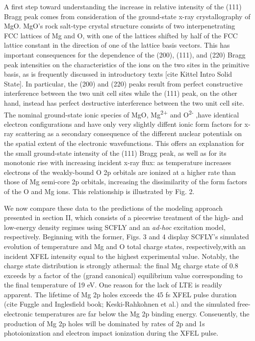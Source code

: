 A first step toward understanding the increase in relative intensity of
the (111) Bragg peak comes from consideration of the ground-state x-ray
crystallography of MgO. MgO's rock salt-type crystal structure consists
of two interpenetrating FCC lattices of Mg and O, with one of the
lattices shifted by half of the FCC lattice constant in the direction of
one of the lattice basis vectors. This has important consequences for
the dependence of the (200), (111), and (220) Bragg peak intensities on
the characteristics of the ions on the two sites in the primitive basis,
as is frequently discussed in introductory texts {[}cite Kittel Intro
Solid State{]}. In particular, the (200) and (220) peaks result from
perfect constructive interference between the two unit cell sites while
the (111) peak, on the other hand, instead has perfect destructive
interference between the two unit cell site. The nominal ground-state
ionic species of MgO, Mg\textsuperscript{2+} and O\textsuperscript{2-}
,have identical electron configurations and have only very slightly
diffent ionic form factors for x-ray scattering as a secondary
consequence of the different nuclear potentials on the spatial extent of
the electronic wavefunctions. This offers an explanation for the small
ground-state intensity of the (111) Bragg peak, as well as for its
monotonic rise with increasing incident x-ray flux: as temperature
increases electrons of the weakly-bound O 2p orbitals are ionized at a
higher rate than those of Mg semi-core 2p orbitals, increasing the
dissimilarity of the form factors of the O and Mg ions. This
relationship is illustrated by Fig. 2.

We now compare these data to the predictions of the modeling approach
presented in section II, which consists of a piecewise treatment of the
high- and low-energy density regimes using SCFLY and an \emph{ad-hoc}
excitation model, respectively. Beginning with the former, Figs. 3 and 4
display SCFLY's simulated evolution of temperature and Mg and O total
charge states, respectively,with an incident XFEL intensity equal to the
highest experimental value. Notably, the charge state distribution is
strongly athermal: the final Mg charge state of 0.8 exceeds by a factor
of the (grand canonical) equilibrium value
corresponding to the final temperature of 19 eV. One reason for the
lack of LTE is readily apparent. The lifetime of Mg 2p holes exceeds the
45 fs XFEL pulse duration (cite Fuggle and Inglesfield book;
Keski-Rahkohnen et al.) and the simulated free-electronic temperatures
are far below the Mg 2p binding energy. Conseuently, the production of
Mg 2p holes will be dominated by rates of 2p and 1s photoionization and
electron impact ionization during the XFEL pulse.


